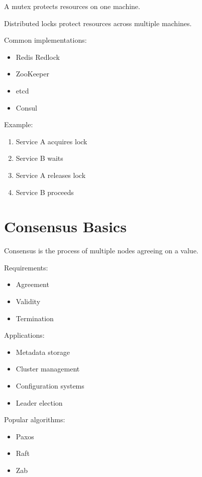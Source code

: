 A mutex protects resources on one machine.

Distributed locks protect resources across multiple machines.

Common implementations:

\begin{itemize}
\item Redis Redlock
\item ZooKeeper
\item etcd
\item Consul
\end{itemize}

Example:

\begin{enumerate}
\item Service A acquires lock
\item Service B waits
\item Service A releases lock
\item Service B proceeds
\end{enumerate}

\section{Consensus Basics}

Consensus is the process of multiple nodes agreeing on a value.

Requirements:

\begin{itemize}
\item Agreement
\item Validity
\item Termination
\end{itemize}

Applications:

\begin{itemize}
\item Metadata storage
\item Cluster management
\item Configuration systems
\item Leader election
\end{itemize}

Popular algorithms:

\begin{itemize}
\item Paxos
\item Raft
\item Zab
\end{itemize}

